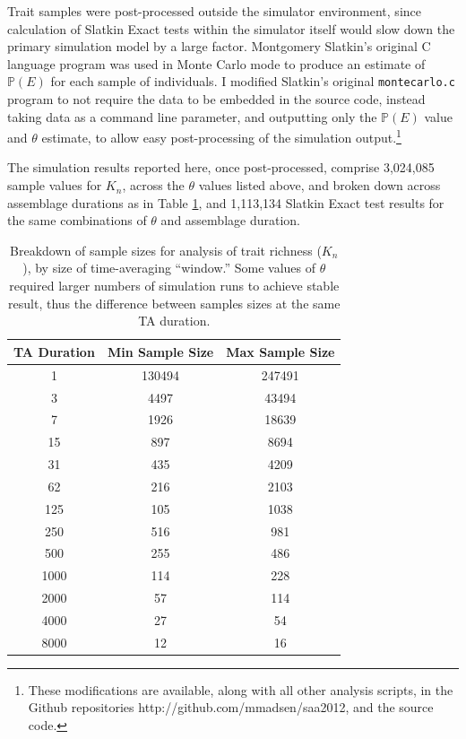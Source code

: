 Trait samples were post-processed outside the simulator environment, since calculation of Slatkin Exact tests within the simulator itself would slow down the primary simulation model by a large factor.   Montgomery Slatkin's original C language program was used in Monte Carlo mode to produce an estimate of $\mathbb{P}(E)$ for each sample of individuals.  I modified Slatkin's original \texttt{montecarlo.c} program to not require the data to be embedded in the source code, instead taking data as a command line parameter, and outputting only the $\mathbb{P}(E)$ value and $\theta$ estimate, to allow easy post-processing of the simulation output.\footnote{These modifications are available, along with all other analysis scripts, in the Github repositories http://github.com/mmadsen/saa2012, and the \tf source code.}  

The simulation results reported here, once post-processed, comprise 3,024,085 sample values for $K_n$, across the $\theta$ values listed above, and broken down across assemblage durations as in Table \ref{tab:sample-size-kn}, and 1,113,134 Slatkin Exact test results for the same combinations of $\theta$ and assemblage duration.   

\begin{table}[ht]
\begin{tabular}{|c|c|c|}
\hline
TA Duration & Min Sample Size & Max Sample Size \\ 
  \hline
  1 & 130494 & 247491 \\ 
    3 & 4497 & 43494 \\ 
    7 & 1926 & 18639 \\ 
   15 & 897 & 8694 \\ 
   31 & 435 & 4209 \\ 
   62 & 216 & 2103 \\ 
  125 & 105 & 1038 \\ 
  250 & 516 & 981 \\ 
  500 & 255 & 486 \\ 
  1000 & 114 & 228 \\ 
  2000 &  57 & 114 \\ 
  4000 &  27 &  54 \\ 
  8000 &  12 &  16 \\ 
  \hline
\end{tabular}
\caption{Breakdown of sample sizes for analysis of trait richness ($K_n$), by size of time-averaging ``window.''  Some values of $\theta$ required larger numbers of simulation runs to achieve stable result, thus the difference between samples sizes at the same TA duration.}
\label{tab:sample-size-kn}
\end{table}



